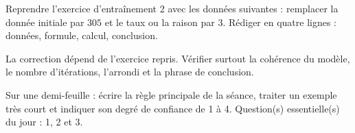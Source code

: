
\begin{homework}Reprendre l'exercice d'entraînement 2 avec les données suivantes : remplacer la donnée initiale par $305$ et le taux ou la raison par $3$. Rédiger en quatre lignes : données, formule, calcul, conclusion.\end{homework}
\begin{solution}La correction dépend de l'exercice repris. Vérifier surtout la cohérence du modèle, le nombre d'itérations, l'arrondi et la phrase de conclusion.\end{solution}

\begin{exitticket}[3 minutes]Sur une demi-feuille : écrire la règle principale de la séance, traiter un exemple très court et indiquer son degré de confiance de 1 à 4. Question(s) essentielle(s) du jour : 1, 2 et 3.\end{exitticket}

